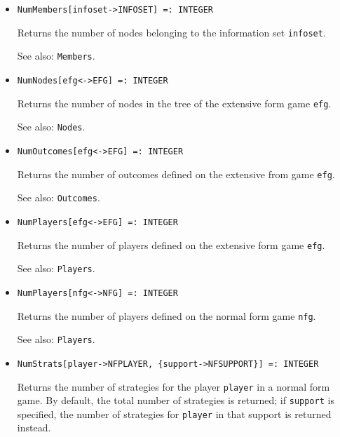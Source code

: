\begin{itemize}
\item
\protect \large \begin{verbatim}
NumMembers[infoset->INFOSET] =: INTEGER
\end{verbatim}\normalsize

\bd
Returns the number of nodes belonging to the information
set \verb+infoset+.
\item
[See also:] {\tt Members}.
\ed

\item
\protect \large \begin{verbatim}
NumNodes[efg<->EFG] =: INTEGER
\end{verbatim}\normalsize

\bd
Returns the number of nodes in the tree of the extensive form
game \verb+efg+.
\item
[See also:] {\tt Nodes}.
\ed

\item
\protect \large \begin{verbatim}
NumOutcomes[efg<->EFG] =: INTEGER
\end{verbatim} \normalsize

\bd
Returns the number of outcomes defined on the extensive from
game \verb+efg+.
\item
[See also:] {\tt Outcomes}.
\ed

\item
\protect \large \begin{verbatim}
NumPlayers[efg<->EFG] =: INTEGER
\end{verbatim} \normalsize

\bd
Returns the number of players defined on the extensive form
game \verb+efg+.
\item
[See also:] {\tt Players}.
\ed

\item
\protect \large \begin{verbatim}
NumPlayers[nfg<->NFG] =: INTEGER
\end{verbatim} \normalsize

\bd
Returns the number of players defined on the normal form
game \verb+nfg+.
\item
[See also:] {\tt Players}.
\ed

\item
\protect \large \begin{verbatim}
NumStrats[player->NFPLAYER, {support->NFSUPPORT}] =: INTEGER
\end{verbatim}\normalsize

\bd
Returns the number of strategies for the player \verb+player+
in a normal form game.  By default, the total number of strategies is
returned; if \verb+support+ is specified, the number of strategies
for \verb+player+ in that support is returned instead.
\ed


\end{itemize}
